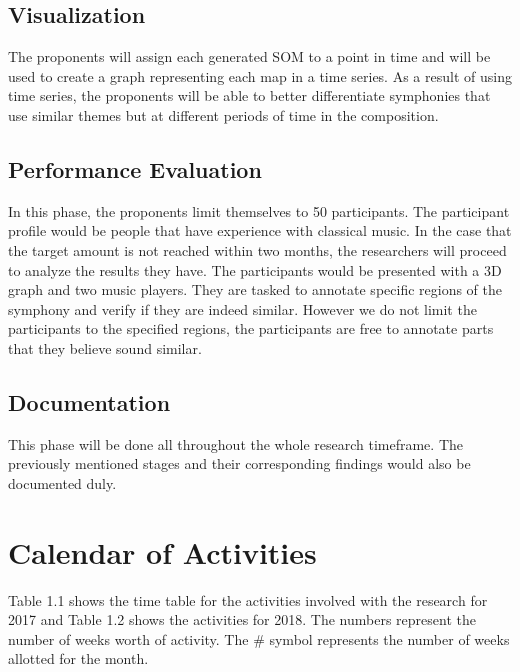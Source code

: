\subsection{Visualization}
The proponents will assign each generated SOM to a point in time and will be used to create a graph representing each map in a time series. As a result of using time series,  the proponents will be able to better differentiate symphonies that use similar themes but at different periods of time in the composition.

\subsection{Performance Evaluation}
In this phase, the proponents limit themselves to 50 participants. The participant profile would be people that have experience with classical music. In the case that the target amount is not reached within two months, the researchers will proceed to analyze the results they have. The participants would be presented with a 3D graph and two music players. They are tasked to annotate specific regions of the symphony and verify if they are indeed similar. However we do not limit the participants to the specified regions, the participants are free to annotate parts that they believe sound similar.

\subsection{Documentation}
This phase will be done all throughout the whole research timeframe. The previously mentioned stages and their corresponding findings would also be documented duly.

\section{Calendar of Activities}
Table 1.1 shows the time table for the activities involved with the research for 2017 and Table 1.2 shows the activities for 2018. The numbers represent the number of weeks worth of activity. The \# symbol represents the number of weeks allotted for the month.

